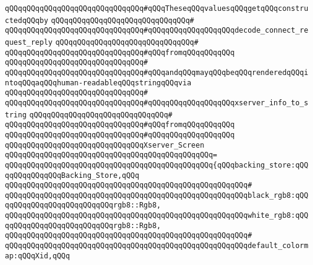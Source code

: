 \verb|qQQqqQQqqQQqqQQqqQQqqQQqqQQqqQQq#qQQqTheseqQQqvaluesqQQqgetqQQqconstructedqQQqby|\newline
\verb|qQQqqQQqqQQqqQQqqQQqqQQqqQQqqQQq#|\newline
\verb|qQQqqQQqqQQqqQQqqQQqqQQqqQQqqQQq#qQQqqQQqqQQqqQQqqQQqdecode_connect_request_reply|\newline
\verb|qQQqqQQqqQQqqQQqqQQqqQQqqQQqqQQq#|\newline
\verb|qQQqqQQqqQQqqQQqqQQqqQQqqQQqqQQq#qQQqfromqQQqqQQqqQQq|\newline
\verb|qQQqqQQqqQQqqQQqqQQqqQQqqQQqqQQq#|\newline
\verb|qQQqqQQqqQQqqQQqqQQqqQQqqQQqqQQq#qQQqandqQQqmayqQQqbeqQQqrenderedqQQqintoqQQqaqQQqhuman-readableqQQqstringqQQqvia|\newline
\verb|qQQqqQQqqQQqqQQqqQQqqQQqqQQqqQQq#|\newline
\verb|qQQqqQQqqQQqqQQqqQQqqQQqqQQqqQQq#qQQqqQQqqQQqqQQqqQQqxserver_info_to_string|\newline
\verb|qQQqqQQqqQQqqQQqqQQqqQQqqQQqqQQq#|\newline
\verb|qQQqqQQqqQQqqQQqqQQqqQQqqQQqqQQq#qQQqfromqQQqqQQqqQQq|\newline
\verb|qQQqqQQqqQQqqQQqqQQqqQQqqQQqqQQq#qQQqqQQqqQQqqQQqqQQq|\newline
\verb|qQQqqQQqqQQqqQQqqQQqqQQqqQQqqQQqXserver_Screen|\newline
\verb|qQQqqQQqqQQqqQQqqQQqqQQqqQQqqQQqqQQqqQQqqQQqqQQq=|\newline
\verb|qQQqqQQqqQQqqQQqqQQqqQQqqQQqqQQqqQQqqQQqqQQqqQQq{qQQqbacking_store:qQQqqQQqqQQqqQQqBacking_Store,qQQq|\newline
\verb|qQQqqQQqqQQqqQQqqQQqqQQqqQQqqQQqqQQqqQQqqQQqqQQqqQQqqQQq#|\newline
\verb|qQQqqQQqqQQqqQQqqQQqqQQqqQQqqQQqqQQqqQQqqQQqqQQqqQQqqQQqblack_rgb8:qQQqqQQqqQQqqQQqqQQqqQQqqQQqrgb8::Rgb8,|\newline
\verb|qQQqqQQqqQQqqQQqqQQqqQQqqQQqqQQqqQQqqQQqqQQqqQQqqQQqqQQqwhite_rgb8:qQQqqQQqqQQqqQQqqQQqqQQqqQQqrgb8::Rgb8,|\newline
\verb|qQQqqQQqqQQqqQQqqQQqqQQqqQQqqQQqqQQqqQQqqQQqqQQqqQQqqQQq#|\newline
\verb|qQQqqQQqqQQqqQQqqQQqqQQqqQQqqQQqqQQqqQQqqQQqqQQqqQQqqQQqdefault_colormap:qQQqXid,qQQq|\newline
